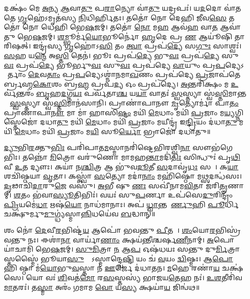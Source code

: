 𑌦𑌕𑍍𑌷𑌂॑ 𑌮𑍇 \ul{𑌅}𑌨𑍍𑌯 \ul{𑌆}𑌵𑌾\ul{𑌤𑍁} 𑌪\ul{𑌰𑌾}𑌨𑍍𑌯𑍋 𑌵𑌾॑\ul{𑌤𑍁} 𑌯𑌦𑍍𑌰𑌪𑌃॑। 𑌯\ul{𑌦}𑌦𑍋 𑌵𑌾॑𑌤𑌤𑍇 \ul{𑌗𑍃}𑌹𑍇॑𑌽𑌮𑍃𑌤॑𑌸𑍍𑌯 \ul{𑌨𑌿}𑌧𑌿𑌰𑍍\mbox{}\ul{𑌹𑌿}𑌤𑌃। 𑌤𑌤𑍋॑ 𑌨𑍋 𑌦𑍇𑌹𑌿 \ul{𑌜𑍀}𑌵\ul{𑌸𑍇} 𑌤𑌤𑍋॑ 𑌨𑍋 𑌧𑍇𑌹𑌿 𑌭𑍇\ul{𑌷}𑌜𑌮𑍍। 𑌤𑌤𑍋॑ \ul{𑌨𑍋} 𑌮\ul{𑌹} 𑌆𑌵॑\ul{𑌹} 𑌵𑌾\ul{𑌤} 𑌆𑌵𑌾॑𑌤𑍁 𑌭𑍇\ul{𑌷}𑌜𑌮𑍍। \ul{𑌶}𑌮𑍍𑌭𑍂𑌰𑍍𑌮॑\ul{𑌯𑍋}𑌭𑍂𑌰𑍍𑌨𑍋॑ \ul{𑌹𑍃}𑌦𑍇 𑌪𑍍𑌰 \ul{𑌣} 𑌆𑌯𑍂॑𑌷𑌿 𑌤𑌾𑌰𑌿𑌷𑌤𑍍। 𑌇𑌨𑍍𑌦𑍍𑌰॑𑌸𑍍𑌯 \ul{𑌗𑍃}𑌹𑍋॑𑌽\ul{𑌸𑌿} 𑌤𑌂 \ul{𑌤𑍍𑌵𑌾} 𑌪𑍍𑌰𑌪॑\ul{𑌦𑍍𑌯𑍇} 𑌸\ul{𑌗𑍁𑌃} 𑌸𑌾𑌶𑍍𑌵𑌃॑। \ul{𑌸}𑌹 𑌯\ul{𑌨𑍍𑌮𑍇} 𑌅\ul{𑌸𑍍𑌤𑌿} 𑌤𑍇𑌨॑। 𑌭𑍂𑌃 𑌪𑍍𑌰𑌪॑\ul{𑌦𑍍𑌯𑍇} 𑌭𑍁\ul{𑌵𑌃} 𑌪𑍍𑌰𑌪॑\ul{𑌦𑍍𑌯𑍇} 𑌸𑍁\ul{𑌵𑌃} 𑌪𑍍𑌰𑌪॑\ul{𑌦𑍍𑌯𑍇} 𑌭𑍂𑌰𑍍𑌭𑍁\ul{𑌵𑌃} 𑌸𑍁\ul{𑌵𑌃} 𑌪𑍍𑌰𑌪॑𑌦𑍍𑌯𑍇 \ul{𑌵𑌾}𑌯𑍁𑌂 𑌪𑍍𑌰\ul{𑌪}𑌦𑍍𑌯𑍇𑌽𑌨𑌾᳚𑌰𑍍𑌤𑌾𑌂 \ul{𑌦𑍇}𑌵\ul{𑌤𑌾𑌂} 𑌪𑍍𑌰\ul{𑌪}𑌦𑍍𑌯𑍇𑌽𑌶𑍍𑌮𑌾॑𑌨𑌮𑌾\ul{𑌖}𑌣𑌂 𑌪𑍍𑌰𑌪॑𑌦𑍍𑌯𑍇 \ul{𑌪𑍍𑌰}𑌜𑌾𑌪॑𑌤𑍇𑌰𑍍𑌬𑍍𑌰𑌹𑍍𑌮\ul{𑌕𑍋}𑌶𑌂 𑌬𑍍𑌰\ul{𑌹𑍍𑌮} 𑌪𑍍𑌰𑌪॑\ul{𑌦𑍍𑌯} 𑌓𑌂 𑌪𑍍𑌰𑌪॑𑌦𑍍𑌯𑍇। \ul{𑌅}𑌨𑍍𑌤𑌰𑌿॑𑌕𑍍𑌷𑌂 𑌮 \ul{𑌉}𑌰𑍍𑌵॑𑌨𑍍𑌤𑌰𑌂॑ \ul{𑌬𑍃}𑌹\ul{𑌦}𑌗𑍍𑌨\ul{𑌯𑌃} 𑌪𑌰𑍍𑌵॑𑌤𑌾\ul{𑌶𑍍𑌚} 𑌯\ul{𑌯𑌾} 𑌵𑌾𑌤𑌃॑ \ul{𑌸𑍍𑌵}𑌸𑍍𑌤𑍍𑌯𑌾 𑌸𑍍𑌵॑\ul{𑌸𑍍𑌤𑌿}𑌮𑌾𑌨𑍍𑌤𑌯𑌾᳚ \ul{𑌸𑍍𑌵}𑌸𑍍𑌤𑍍𑌯𑌾 𑌸𑍍𑌵॑\ul{𑌸𑍍𑌤𑌿}𑌮𑌾𑌨॑𑌸𑌾𑌨𑌿। 𑌪𑍍𑌰𑌾𑌣𑌾॑𑌪𑌾𑌨𑍗 \ul{𑌮𑍃}𑌤𑍍𑌯𑍋𑌰𑍍𑌮𑌾॑ 𑌪𑌾\ul{𑌤𑌂} 𑌪𑍍𑌰𑌾𑌣𑌾॑𑌪𑌾\ul{𑌨𑍗} 𑌮𑌾 𑌮𑌾॑ 𑌹𑌾𑌸𑌿\ul{𑌷𑍍𑌟𑌂} 𑌮𑌯𑌿॑ \ul{𑌮𑍇}𑌧𑌾𑌂 𑌮𑌯𑌿॑ \ul{𑌪𑍍𑌰}𑌜𑌾𑌂 𑌮\ul{𑌯𑍍𑌯}𑌗𑍍𑌨𑌿𑌸𑍍𑌤𑍇𑌜𑍋॑ 𑌦𑌧𑌾\ul{𑌤𑍁} 𑌮𑌯𑌿॑ \ul{𑌮𑍇}𑌧𑌾𑌂 𑌮𑌯𑌿॑ \ul{𑌪𑍍𑌰}𑌜𑌾𑌂 𑌮𑌯𑍀𑌨𑍍𑌦𑍍𑌰॑ 𑌇\ul{𑌨𑍍𑌦𑍍𑌰𑌿}𑌯𑌂 𑌦॑𑌧𑌾\ul{𑌤𑍁} 𑌮𑌯𑌿॑ \ul{𑌮𑍇}𑌧𑌾𑌂 𑌮𑌯𑌿॑ \ul{𑌪𑍍𑌰}𑌜𑌾𑌂 𑌮\ul{𑌯𑌿} 𑌸𑍂\ul{𑌰𑍍𑌯𑍋} 𑌭𑍍𑌰𑌾𑌜𑍋॑ 𑌦𑌧𑌾𑌤𑍁॥

\ul{𑌦𑍍𑌯𑍁}𑌭𑌿\ul{𑌰}𑌕𑍍𑌤𑍁\ul{𑌭𑌿𑌃} 𑌪𑌰𑌿॑𑌪𑌾𑌤\ul{𑌮}𑌸𑍍𑌮𑌾𑌨𑌰𑌿॑𑌷𑍍𑌟𑍇𑌭𑌿𑌰𑌶𑍍𑌵𑌿\ul{𑌨𑌾} 𑌸𑍗𑌭॑𑌗𑍇𑌭𑌿𑌃। 𑌤𑌨𑍍𑌨𑍋॑ \ul{𑌮𑌿}𑌤𑍍𑌰𑍋 𑌵𑌰𑍁॑𑌣𑍋 𑌮𑌾𑌮𑌹\ul{𑌨𑍍𑌤𑌾}𑌮𑌦𑌿॑\ul{𑌤𑌿𑌃} 𑌸𑌿𑌨𑍍𑌧𑍁𑌃॑ 𑌪𑍃\ul{𑌥𑌿}𑌵𑍀 \ul{𑌉}𑌤 𑌦𑍍𑌯𑍗𑌃। 𑌕𑌯𑌾॑ 𑌨\ul{𑌶𑍍𑌚𑌿}𑌤𑍍𑌰 𑌆 𑌭𑍁॑𑌵\ul{𑌦𑍂}𑌤𑍀 \ul{𑌸}𑌦𑌾𑌵𑍃॑\ul{𑌧𑌃} 𑌸𑌖𑌾᳚। 𑌕\ul{𑌯𑌾} 𑌶𑌚𑌿॑𑌷𑍍𑌠𑌯𑌾 \ul{𑌵𑍃}𑌤𑌾। 𑌕𑌸𑍍𑌤𑍍𑌵𑌾॑ \ul{𑌸}𑌤𑍍𑌯𑍋 𑌮𑌦𑌾॑\ul{𑌨𑌾𑌂} 𑌮𑌹𑌿॑𑌷𑍍𑌠𑍋 𑌮\ul{𑌥𑍍𑌸}𑌦𑌨𑍍𑌧॑𑌸𑌃। \ul{𑌦𑍃}𑌢𑌾𑌚𑌿॑\ul{𑌦𑌾}𑌰𑍁\ul{𑌜𑍇} 𑌵𑌸𑍁॑। \ul{𑌅}𑌭𑍀 𑌷𑍁 \ul{𑌣𑌃} 𑌸𑌖𑍀॑𑌨𑌾𑌮\ul{𑌵𑌿}𑌤𑌾 𑌜॑𑌰𑌿\ul{𑌤𑍄}𑌣𑌾𑌮𑍍। \ul{𑌶}𑌤𑌂 𑌭॑𑌵𑌾\ul{𑌸𑍍𑌯𑍂}𑌤𑌿𑌭𑌿𑌃॑। 𑌵𑌯𑌃॑ 𑌸𑍁\ul{𑌪}𑌰𑍍𑌣𑌾 𑌉𑌪॑𑌸𑍇\ul{𑌦𑍁}𑌰𑌿𑌨𑍍𑌦𑍍𑌰𑌂॑ \ul{𑌪𑍍𑌰𑌿}𑌯𑌮𑍇॑\ul{𑌧𑌾} 𑌋𑌷॑\ul{𑌯𑍋} 𑌨𑌾𑌧॑𑌮𑌾𑌨𑌾𑌃। 𑌅𑌪॑ \ul{𑌧𑍍𑌵𑌾}𑌨𑍍𑌤𑌮𑍂᳚\ul{𑌰𑍍𑌣𑍁}𑌹𑌿 \ul{𑌪𑍂}𑌰𑍍𑌧𑌿 𑌚𑌕𑍍𑌷𑍁॑𑌰𑍍𑌮𑍁\ul{𑌮𑍁}𑌗𑍍𑌧𑍍𑌯॑𑌸𑍍𑌮𑌾\ul{𑌨𑍍𑌨𑌿}𑌧𑌯𑍇॑𑌵 \ul{𑌬}𑌦𑍍𑌧𑌾𑌨𑍍॥

𑌶𑌂 𑌨𑍋॑ \ul{𑌦𑍇}𑌵𑍀\ul{𑌰}𑌭𑌿𑌷𑍍𑌟॑\ul{𑌯} 𑌆𑌪𑍋॑ 𑌭𑌵𑌨𑍍𑌤𑍁 \ul{𑌪𑍀}𑌤𑌯𑍇᳚। \ul{𑌶𑌂}𑌯𑍋\ul{𑌰}𑌭𑌿𑌸𑍍𑌰॑𑌵𑌨𑍍𑌤𑍁 𑌨𑌃। 𑌈𑌶𑌾॑\ul{𑌨𑌾} 𑌵𑌾𑌰𑍍𑌯𑌾॑\ul{𑌣𑌾𑌂} 𑌕𑍍𑌷𑌯॑𑌨𑍍𑌤𑍀𑌶𑍍𑌚𑌰𑍍\mbox{}𑌷\ul{𑌣𑍀}𑌨𑌾𑌮𑍍। \ul{𑌅}𑌪𑍋 𑌯𑌾॑𑌚𑌾𑌮𑌿 𑌭𑍇\ul{𑌷}𑌜𑌮𑍍। \ul{𑌸𑍁}\ul{𑌮𑌿}𑌤𑍍𑌰𑌾 \ul{𑌨} 𑌆\ul{𑌪} 𑌓𑌷॑𑌧𑌯𑌃 𑌸𑌨𑍍𑌤𑍁 𑌦𑍁\ul{𑌰𑍍𑌮𑌿}𑌤𑍍𑌰𑌾𑌸𑍍𑌤𑌸𑍍𑌮𑍈॑ 𑌭𑍂𑌯𑌾\ul{𑌸𑍁}𑌰𑍍𑌯𑍋᳚𑌽𑌸𑍍𑌮𑌾𑌨𑍍𑌦𑍍𑌵𑍇\ul{𑌷𑍍𑌟𑌿} 𑌯𑌂 𑌚॑ \ul{𑌵}𑌯𑌂 \ul{𑌦𑍍𑌵𑌿}𑌷𑍍𑌮𑌃। 𑌆\ul{𑌪𑍋} 𑌹𑌿 𑌷𑍍𑌠𑌾 𑌮॑\ul{𑌯𑍋}𑌭𑍁\ul{𑌵}𑌸𑍍𑌤𑌾 𑌨॑ \ul{𑌊}𑌰𑍍𑌜𑍇 𑌦॑𑌧𑌾𑌤𑌨। \ul{𑌮}𑌹𑍇 𑌰𑌣𑌾॑\ul{𑌯} 𑌚𑌕𑍍𑌷॑𑌸𑍇। 𑌯𑍋 𑌵𑌃॑ \ul{𑌶𑌿}𑌵𑌤॑\ul{𑌮𑍋} 𑌰\ul{𑌸}𑌸𑍍𑌤𑌸𑍍𑌯॑ 𑌭𑌾𑌜𑌯\ul{𑌤𑍇}𑌹 𑌨𑌃॑। \ul{𑌉}\ul{𑌶}𑌤𑍀𑌰𑌿॑𑌵 \ul{𑌮𑌾}𑌤𑌰𑌃॑। 𑌤\ul{𑌸𑍍𑌮𑌾} 𑌅𑌰𑌂॑ 𑌗𑌮𑌾𑌮 \ul{𑌵𑍋} 𑌯\ul{𑌸𑍍𑌯} 𑌕𑍍𑌷𑌯𑌾॑\ul{𑌯} 𑌜𑌿𑌨𑍍𑌵॑𑌥॥

